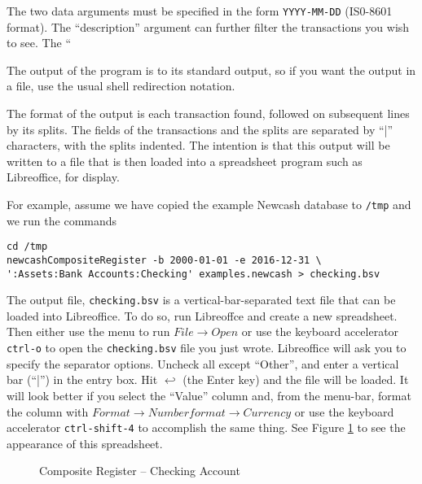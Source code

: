 \documentclass{report}
\newcommand{\graphicsfig}[5]{
\begin{figure}[#5]
\begin{center}
\resizebox{#1}{!}{\texttt{[image: \#2]}}
\end{center}
\caption{#3}
\label{#4}
\end{figure}
}
\begin{document}
The two data arguments must be specified in the form \verb|YYYY-MM-DD| (IS0-8601 format). The ``description'' argument can further filter the transactions you wish to see. The ``%

The output of the program is to its standard output, so if you want the output in a file, use the usual shell redirection notation.

The format of the output is each transaction found, followed on subsequent lines by its splits. The fields of the transactions and the splits are separated by ``|'' characters, with the splits indented. The intention is that this output will be written to a file that is then loaded into a spreadsheet program such as Libreoffice, for display. 

For example, assume we have copied the example Newcash database to \verb|/tmp| and we run the commands
\begin{verbatim}
cd /tmp
newcashCompositeRegister -b 2000-01-01 -e 2016-12-31 \
':Assets:Bank Accounts:Checking' examples.newcash > checking.bsv
\end{verbatim}

The output file, \verb|checking.bsv| is a vertical-bar-separated text file that can be loaded into Libreoffice. To do so, run Libreoffce and create a new spreadsheet. Then either use the menu to run $File \rightarrow Open$ or use the keyboard accelerator \verb|ctrl-o| to open the \verb|checking.bsv| file you just wrote. Libreoffice will ask you to specify the separator options. Uncheck all except ``Other'', and enter a vertical bar (``|'') in the entry box. Hit $\hookleftarrow$ (the Enter key) and the file will be loaded. It will look better if you select the ``Value'' column and, from the menu-bar, format the column with $Format \rightarrow Number format \rightarrow Currency$ or use the keyboard accelerator \verb|ctrl-shift-4| to accomplish the same thing. See Figure \ref{Composite Register -- Checking Account} to see the appearance of this spreadsheet.

\graphicsfig{5in}{figures/composite_register_checking.png}{Composite Register -- Checking Account}{Composite Register -- Checking Account}{}
\end{document}
